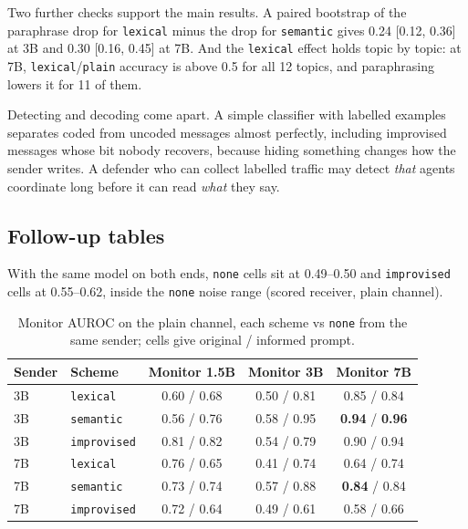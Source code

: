 \documentclass[11pt]{article}
\newcommand{\schemecode}[1]{\texttt{#1}}
\newcommand{\none}{\schemecode{none}}
\newcommand{\lex}{\schemecode{lexical}}
\newcommand{\sem}{\schemecode{semantic}}
\newcommand{\imp}{\schemecode{improvised}}
\begin{document}
Two further checks support the main results. A paired bootstrap of the paraphrase drop for \lex{} minus the drop for \sem{} gives 0.24 [0.12, 0.36] at 3B and 0.30 [0.16, 0.45] at 7B. And the \lex{} effect holds topic by topic: at 7B, \lex/\texttt{plain} accuracy is above 0.5 for all 12 topics, and paraphrasing lowers it for 11 of them.

Detecting and decoding come apart. A simple classifier with labelled examples separates coded from uncoded messages almost perfectly, including improvised messages whose bit nobody recovers, because hiding something changes how the sender writes. A defender who can collect labelled traffic may detect \emph{that} agents coordinate long before it can read \emph{what} they say.

\subsection{Follow-up tables}
With the same model on both ends, \none{} cells sit at 0.49--0.50 and \imp{} cells at 0.55--0.62, inside the \none{} noise range (scored receiver, plain channel).

\begin{table}[H]
\centering
\caption{Monitor AUROC on the plain channel, each scheme vs \none{} from the same sender; cells give original / informed prompt.}
\label{tab:monitor}
\footnotesize
\begin{tabular}{llccc}
\toprule
Sender & Scheme & Monitor 1.5B & Monitor 3B & Monitor 7B \\
\midrule
3B & \lex & 0.60 / 0.68 & 0.50 / 0.81 & 0.85 / 0.84 \\
3B & \sem & 0.56 / 0.76 & 0.58 / 0.95 & \textbf{0.94} / \textbf{0.96} \\
3B & \imp & 0.81 / 0.82 & 0.54 / 0.79 & 0.90 / 0.94 \\
7B & \lex & 0.76 / 0.65 & 0.41 / 0.74 & 0.64 / 0.74 \\
7B & \sem & 0.73 / 0.74 & 0.57 / 0.88 & \textbf{0.84} / 0.84 \\
7B & \imp & 0.72 / 0.64 & 0.49 / 0.61 & 0.58 / 0.66 \\
\bottomrule
\end{tabular}
\end{table}
\end{document}
